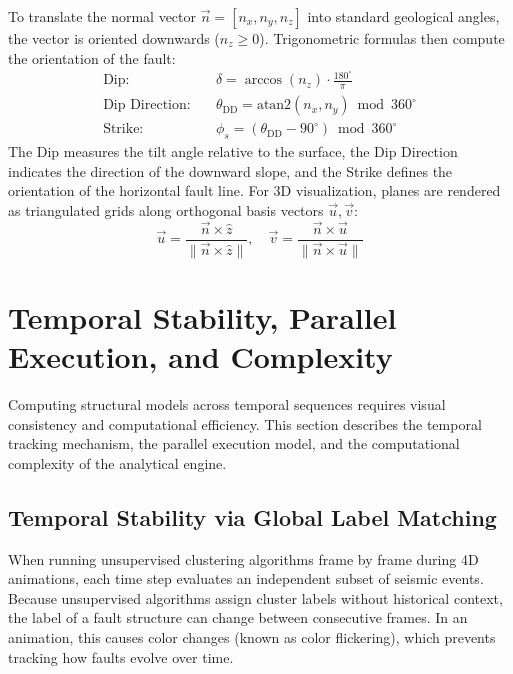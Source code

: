 To translate the normal vector $\vec{n} = [n_x, n_y, n_z]$ into standard geological angles, the vector is oriented downwards ($n_z \ge 0$). Trigonometric formulas then compute the orientation of the fault:
\begin{align}
    \text{Dip}: \quad & \delta = \arccos(n_z) \cdot \frac{180^\circ}{\pi} \label{eq:dip} \\
    \text{Dip Direction}: \quad & \theta_\text{DD} = \text{atan2}(n_x, n_y) \bmod 360^\circ \label{eq:dip-dir} \\
    \text{Strike}: \quad & \phi_s = (\theta_\text{DD} - 90^\circ) \bmod 360^\circ \label{eq:strike}
\end{align}
The Dip measures the tilt angle relative to the surface, the Dip Direction indicates the direction of the downward slope, and the Strike defines the orientation of the horizontal fault line. For 3D visualization, planes are rendered as triangulated grids along orthogonal basis vectors $\vec{u}, \vec{v}$:
\begin{equation}
    \vec{u} = \frac{\vec{n} \times \hat{z}}{\|\vec{n} \times \hat{z}\|}, \quad \vec{v} = \frac{\vec{n} \times \vec{u}}{\|\vec{n} \times \vec{u}\|}
    \label{eq:basis-vectors}
\end{equation}

\section{Temporal Stability, Parallel Execution, and Complexity}
\label{sec:label-matching}
\label{sec:parallel}

Computing structural models across temporal sequences requires visual consistency and computational efficiency. This section describes the temporal tracking mechanism, the parallel execution model, and the computational complexity of the analytical engine.

\subsection{Temporal Stability via Global Label Matching}
\enlargethispage{4\baselineskip}

When running unsupervised clustering algorithms frame by frame during 4D animations, each time step evaluates an independent subset of seismic events. Because unsupervised algorithms assign cluster labels without historical context, the label of a fault structure can change between consecutive frames. In an animation, this causes color changes (known as color flickering), which prevents tracking how faults evolve over time.

